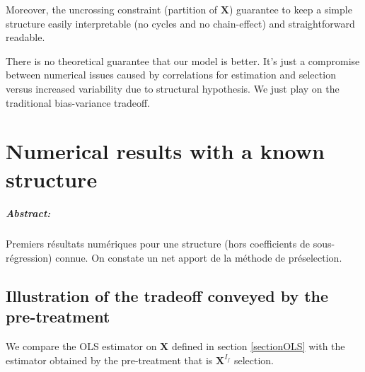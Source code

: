 \documentclass[12pt,a4paper]{report}
\begin{document}
Moreover, the uncrossing constraint (partition of $\boldsymbol{X}$) guarantee to keep a simple structure easily interpretable (no cycles and no chain-effect) and straightforward readable.

	
			There is no theoretical guarantee that our model is better. It's just a compromise between numerical issues caused by correlations for estimation and selection versus increased variability due to structural hypothesis. We just play on the traditional bias-variance tradeoff.
\chapter{Numerical results with a known structure}	
\paragraph{Abstract:} Premiers résultats numériques pour une structure (hors coefficients de sous-régression) connue. On constate un net apport de la méthode de préselection.
		 
	\section{Illustration of the tradeoff conveyed by the pre-treatment}	
	We compare the OLS estimator on $\boldsymbol{X}$ defined in section \ref{sectionOLS} with the estimator obtained by the pre-treatment that is $\boldsymbol{X}^{I_f}$ selection.
  
\end{document}
